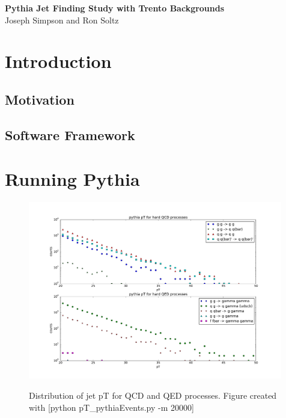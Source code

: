 \documentclass[11pt]{article}
\begin{document}
%
%
\newcommand{\zapspace}{\topsep=1pt\partopsep=1pt\itemsep=1pt\parskip=2pt}

\begin{center}
{\Large \bf Pythia Jet Finding Study with Trento Backgrounds\\}
Joseph Simpson and Ron Soltz
\end{center}

\begin{abstract}
%
%
\end{abstract}

\tableofcontents

\section{Introduction}
%
%

\subsection{Motivation}

\subsection{Software Framework}

\section{Running Pythia}
%
%

\begin{figure}[h]
\begin{center}
\includegraphics[width=0.99\textwidth]{pT_pythiaEvents.pdf}
\label{fig_label}
\caption{Distribution of jet pT for QCD and QED processes.  Figure created with [python pT_pythiaEvents.py -m 20000]}
\end{center}
\end{figure}
\end{document}
